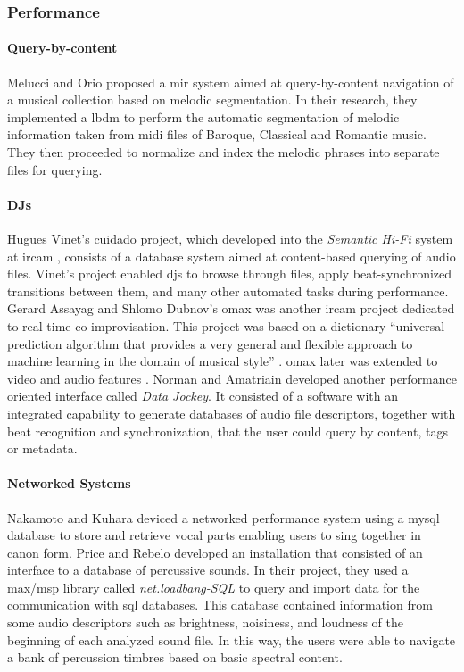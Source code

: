 \subsubsection{Performance}
\label{application:performance}

\paragraph{Query-by-content}
Melucci and Orio \parencite{icmc/bbp2372.1999.355} proposed a \gls{mir} system aimed at query-by-content navigation of a musical collection based on melodic segmentation. In their research, they implemented a \gls{lbdm} to perform the automatic segmentation of melodic information taken from \gls{midi} files of Baroque, Classical and Romantic music. They then proceeded to normalize and index the melodic phrases into separate files for querying.

\paragraph{DJs}
Hugues Vinet's \gls{cuidado} project, which developed into the \textit{Semantic Hi-Fi} system at \gls{ircam} \parencite{DBLP:conf/ismir/VinetHP02, DBLP:conf/icmc/VinetHP02, DBLP:conf/icmc/Vinet05}, consists of a database system aimed at content-based querying of audio files. Vinet's project enabled \glspl{dj} to browse through files, apply beat-synchronized transitions between them, and many other automated tasks during performance. Gerard Assayag and Shlomo Dubnov's \gls{omax} was another \gls{ircam} project dedicated to real-time co-improvisation. This project was based on a dictionary ``universal prediction algorithm that provides a very general and flexible approach to machine learning in the domain of musical style'' \parencite{DBLP:conf/icmc/AssayagDD99}. \gls{omax} later was extended to video and audio features \parencite{DBLP:conf/icmc/BlochD08}. Norman and Amatriain \parencite{icmc/bbp2372.2007.117} developed another performance oriented interface called \textit{Data Jockey}. It consisted of a software with an integrated capability to generate databases of audio file descriptors, together with beat recognition and synchronization, that the user could query by content, tags or metadata.

\paragraph{Networked Systems}
Nakamoto and Kuhara \parencite{Nakamoto2007} deviced a networked performance system using a \gls{mysql} database to store and retrieve vocal parts enabling users to sing together in canon form. Price and Rebelo \parencite{Price2008} developed an installation that consisted of an interface to a database of percussive sounds. In their project, they used a \gls{max/msp} library called \textit{net.loadbang-SQL} to query and import data for the communication with \gls{sql} databases. This database contained information from some audio descriptors such as brightness, noisiness, and loudness of the beginning of each analyzed sound file. In this way, the users were able to navigate a bank of percussion timbres based on basic spectral content. 

